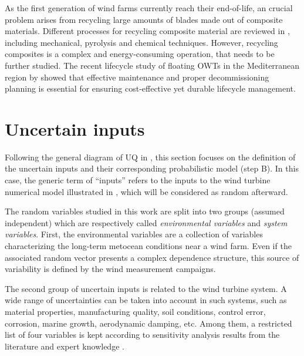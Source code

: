 As the first generation of wind farms currently reach their end-of-life, an crucial problem arises from recycling large amounts of blades made out of composite materials. 
Different processes for recycling composite material are reviewed in \citet{jensen_2018_blade_recycling}, including mechanical, pyrolysis and chemical techniques. 
However, recycling composites is a complex and energy-consuming operation, that needs to be further studied. 
The recent lifecycle study of floating OWTs in the Mediterranean region by \citet{pulselli_2022_FOWT_lifecycle} showed that effective maintenance and 
proper decommissioning planning is essential for ensuring cost-effective yet durable lifecycle management.  




\section{Uncertain inputs} \label{sec:owt_uncertainties}

Following the general diagram of UQ in , this section focuses on the definition of the uncertain inputs and their corresponding probabilistic model (step B). 
In this case, the generic term of ``inputs'' refers to the inputs to the wind turbine numerical model illustrated in , which will be considered as random afterward. 

The random variables studied in this work are split into two groups (assumed independent) which are respectively called \textit{environmental variables} and \textit{system variables}. 
First, the environmental variables are a collection of variables characterizing the long-term metocean conditions near a wind farm.
Even if the associated random vector presents a complex dependence structure, this source of variability is defined by the wind measurement campaigns. 

The second group of uncertain inputs is related to the wind turbine system. 
A wide range of uncertainties can be taken into account in such systems, such as material properties, manufacturing quality, soil conditions, control error, corrosion, marine growth, aerodynamic damping, etc.  
Among them, a restricted list of four variables is kept according to sensitivity analysis results from the literature and expert knowledge \citep{dimitrov_kelly_2018,teixeira_2019,verlade_kramhoft_2019,petrovska_2022}. 



